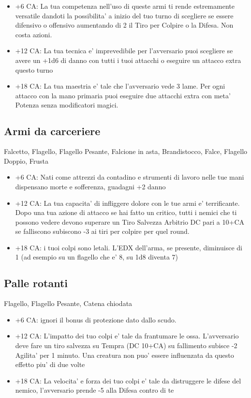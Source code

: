 \documentclass[a4paper,11pt,twoside,openany]{dndbook}
\begin{document}
\begin{itemize}
\item +6 CA: La tua competenza nell'uso di queste armi ti rende estremamente versatile dandoti la possibilita' a inizio del tuo turno di scegliere se essere difensivo o offensivo aumentando di 2 il Tiro per Colpire o la Difesa. Non costa azioni.

\item +12 CA: La tua tecnica e' imprevedibile per l'avversario puoi scegliere se avere un +1d6 di danno con tutti i tuoi attacchi o eseguire un attacco extra questo turno

\item +18 CA: La tua maestria e' tale che l'avversario vede 3 lame. Per ogni attacco con la mano primaria puoi eseguire due attacchi extra con meta' Potenza senza modificatori magici.
\end{itemize}

\subsection{Armi da carceriere} Falcetto, Flagello, Flagello Pesante, Falcione in asta, Brandistocco, Falce, Flagello Doppio, Frusta

\begin{itemize}
\item +6 CA: Nati come attrezzi da contadino e strumenti di lavoro nelle tue mani dispensano morte e sofferenza, guadagni +2 danno

\item +12 CA: La tua capacita' di infliggere dolore con le tue armi e' terrificante. Dopo una tua azione di attacco se hai fatto un critico, tutti i nemici che ti possono vedere devono superare un Tiro Salvezza Arbitrio DC pari a 10+CA se falliscono subiscono -3 ai tiri per colpire per quel round.

\item +18 CA: i tuoi colpi sono letali. L'EDX dell'arma, se presente, diminuisce di 1 (ad esempio su un flagello che e' 8, su 1d8 diventa 7)
\end{itemize}

\subsection{Palle rotanti} Flagello, Flagello Pesante, Catena chiodata

\begin{itemize}
\item +6 CA: ignori il bonus di protezione dato dallo scudo.

\item +12 CA: L'impatto dei tuo colpi e' tale da frantumare le ossa. L'avversario deve fare un tiro salvezza su Tempra (DC 10+CA) su fallimento subisce -2 Agilita' per 1 minuto. Una creatura non puo' essere influenzata da questo effetto piu' di due volte

\item +18 CA: La velocita' e forza dei tuo colpi e' tale da distruggere le difese del nemico, l'avversario prende -5 alla Difesa contro di te 
\end{itemize}
\end{document}
